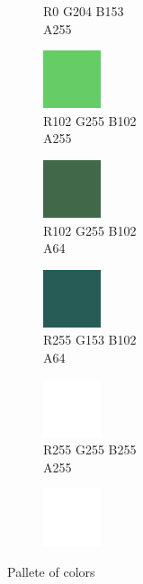 \begin{figure}[h]
\begin{subfigure}{0.105\textwidth}
		\vspace*{-20px} \caption*{\hspace*{-0.25px}\tiny R0 G204 B153 \\ \tiny A255}
	\end{subfigure}
	\begin{subfigure}{0.105\textwidth}
		\centering
		\includegraphics[scale=1, frame]{gui-imgs/R102G255B102A255}
		\vspace*{-20px} \caption*{\hspace*{-0.25px}\tiny R102 G255 B102 \\ \tiny A255}
	\end{subfigure}
	\begin{subfigure}{0.105\textwidth}
		\centering
		\includegraphics[scale=1, frame]{gui-imgs/R102G255B102A64}
		\vspace*{-20px} \caption*{\hspace*{-0.25px}\tiny R102 G255 B102 \\ \tiny A64}
	\end{subfigure}
	\begin{subfigure}{0.105\textwidth}
		\centering
		\includegraphics[scale=1, frame]{gui-imgs/R0G204B153A64}
		\vspace*{-20px} \caption*{\hspace*{-0.25px}\tiny R255 G153 B102 \\ \tiny A64}
	\end{subfigure}
	\begin{subfigure}{0.105\textwidth}
		\centering
		\includegraphics[scale=1, frame]{gui-imgs/R255G255B255A255}
		\vspace*{-20px}\caption*{\hspace*{-0.25px}\tiny R255 G255 B255 \\ \tiny A255}
	\end{subfigure}
	\begin{subfigure}{0.105\textwidth}
		\centering
		\includegraphics[scale=1]{gui-imgs/R255G255B255A255}
	\end{subfigure}
	\caption{Pallete of colors}
\end{figure}

